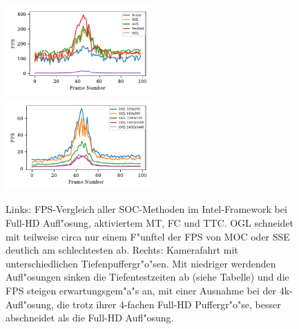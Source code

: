 \documentclass[journal]{vgtc}
\begin{document}
\begin{figure}
	\begin{minipage}{\textwidth}
		\includegraphics[width=0.5\textwidth]{images/Evaluation_1_Results_FPS.pdf}
		\includegraphics[width=0.5\textwidth]{images/Evaluation_4_Results_FPS.pdf}
	\end{minipage}
	\begin{minipage}{\textwidth}
		\centering
	\end{minipage}
	\caption{Links: FPS-Vergleich aller SOC-Methoden im Intel-Framework bei Full-HD Aufl"osung, aktiviertem MT, FC und TTC. OGL schneidet mit teilweise circa nur einem F"unftel der FPS von MOC oder SSE deutlich am schlechtesten ab. Rechts: Kamerafahrt mit unterschiedlichen Tiefenpuffergr"o"sen. Mit niedriger werdenden Aufl"osungen sinken die Tiefentestzeiten ab (siehe Tabelle) und die FPS steigen erwartungsgem"a"s an, mit einer Ausnahme bei der 4k-Aufl"osung, die trotz ihrer 4-fachen Full-HD Puffergr"o"se, besser abschneidet als die Full-HD Aufl"osung.}
	\label{fig:resolution_fps}
\end{figure}
\end{document}
